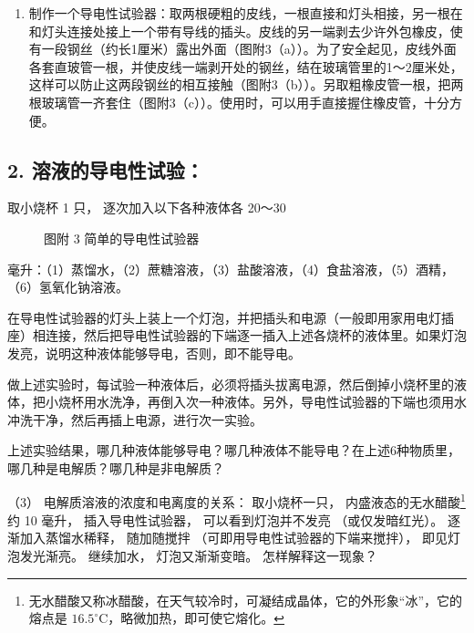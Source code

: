 \begin{enumerate}
\item
  制作一个导电性试验器：取两根硬粗的皮线，一根直接和灯头相接，另一根在和灯头连接处接上一个带有导线的插头。皮线的另一端剥去少许外包橡皮，使有一段钢丝（约长1厘米）露出外面（图附3（a））。为了安全起见，皮线外面各套直玻管一根，并使皮线一端剥开处的钢丝，结在玻璃管里的1～2厘米处，这样可以防止这两段钢丝的相互接触（图附3（b））。另取粗橡皮管一根，把两根玻璃管一齐套住（图附3（c））。使用时，可以用手直接握住橡皮管，十分方便。
\end{enumerate}

\subsection{2. 溶液的导电性试验：}

取小烧杯 1 只， 逐次加入以下各种液体各 20～30

\begin{figure}
\centering
\caption{图附 3 简单的导电性试验器}
\end{figure}

毫升：（1）蒸馏水，（2）蔗糖溶液，（3）盐酸溶液，（4）食盐溶液，（5）酒精，（6）氢氧化钠溶液。

在导电性试验器的灯头上装上一个灯泡，并把插头和电源（一般即用家用电灯插座）相连接，然后把导电性试验器的下端逐一插入上述各烧杯的液体里。如果灯泡发亮，说明这种液体能够导电，否则，即不能导电。

做上述实验时，每试验一种液体后，必须将插头拔离电源，然后倒掉小烧杯里的液体，把小烧杯用水洗净，再倒入次一种液体。另外，导电性试验器的下端也须用水冲洗干净，然后再插上电源，进行次一实验。

上述实验结果，哪几种液体能够导电？哪几种液体不能导电？在上述6种物质里，哪几种是电解质？哪几种是非电解质？

（3） 电解质溶液的浓度和电离度的关系： 取小烧杯一只，
内盛液态的无水醋酸\footnote{无水醋酸又称冰醋酸，在天气较冷时，可凝结成晶体，它的外形象``冰''，它的熔点是
  \(16.5^{\circ} \mathrm{C}\)，略微加热，即可使它熔化。}约 10 毫升，
插入导电性试验器， 可以看到灯泡并不发亮 （或仅发暗红光）。
逐渐加入蒸馏水稀释， 随加随搅拌 （可即用导电性试验器的下端来搅拌），
即见灯泡发光渐亮。 继续加水， 灯泡又渐渐变暗。 怎样解释这一现象？

